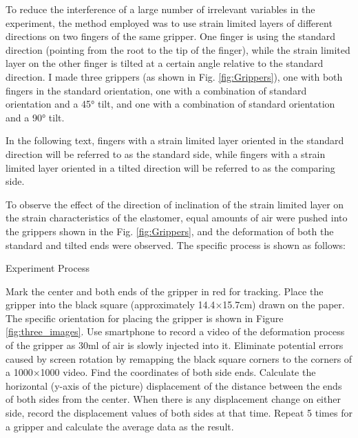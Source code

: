 \documentclass[conference]{IEEEtran}
\begin{document}
To reduce the interference of a large number of irrelevant variables in the experiment, the method employed was to use strain limited layers of different directions on two fingers of the same gripper. One finger is using the standard direction (pointing from the root to the tip of the finger), while the strain limited layer on the other finger is tilted at a certain angle relative to the standard direction. I made three grippers (as shown in Fig. \ref{fig:Grippers}), one with both fingers in the standard orientation, one with a combination of standard orientation and a 45° tilt, and one with a combination of standard orientation and a 90° tilt. 

In the following text, fingers with a strain limited layer oriented in the standard direction will be referred to as the standard side, while fingers with a strain limited layer oriented in a tilted direction will be referred to as the comparing side.

To observe the effect of the direction of inclination of the strain limited layer on the strain characteristics of the elastomer, equal amounts of air were pushed into the grippers shown in the Fig. \ref{fig:Grippers}, and the deformation of both the standard and tilted ends were observed. The specific process is shown as follows:

\begin{algorithm}
	\caption{Experiment Process}\label{pseudo:ExperimentProcess}
	\begin{algorithmic}[1]
            \State Mark the center and both ends of the gripper in red for tracking.
            \State Place the gripper into the black square (approximately 14.4$\times$15.7cm) drawn on the paper. The specific orientation for placing the gripper is shown in Figure \ref{fig:three_images}.
            \State Use smartphone to record a video of the deformation process of the gripper as 30ml of air is slowly injected into it.
            \State Eliminate potential errors caused by screen rotation by remapping the black square corners to the corners of a 1000$\times$1000 video. 
            \State Find the coordinates of both side ends.
            \State Calculate the horizontal (y-axis of the picture) displacement of the distance between the ends of both sides from the center.
            \State When there is any displacement change on either side, record the displacement values of both sides at that time.
            \State Repeat 5 times for a gripper and calculate the average data as the result.
	\end{algorithmic} 
\end{algorithm}
\end{document}
